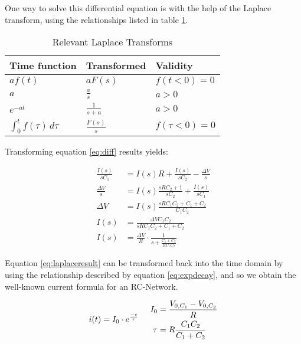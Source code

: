 One way to solve this  differential  equation  is with the help of the Laplace
transform,     using     the      relationships      listed      in      table
\ref{tab:laplace-transforms}.

\begin{table}
    \centering
    \caption{Relevant Laplace Transforms}
    \begin{threeparttable}\begin{tabular}{lll}
        \toprule
        \textbf{Time function}              & \textbf{Transformed} & \textbf{Validity} \\
        \midrule
        $af(t)$                   & $aF(s)$              & $f(t<0)=0$ \\
        $a$                       & $\frac{a}{s}$        & $a > 0$ \\
        $e^{-at}$                 & $\frac{1}{s+a}$      & $a > 0$  \\
        $\int_0^t f(\tau)\,d\tau$ & $\frac{F(s)}{s}$     & $f(\tau<0)=0$ \\
        \bottomrule
    \end{tabular}\end{threeparttable}
    \label{tab:laplace-transforms}
\end{table}

Transforming equation \ref{eq:diff} results yields:

\begin{align}
    \frac{I(s)}{sC_1} &= I(s)R + \frac{I(s)}{sC_2} - \frac{\Delta V}{s}\\
    \frac{\Delta V}{s} &= I(s)\frac{sRC_2 + 1}{sC_2} + \frac{I(s)}{sC_1} \\
    \Delta V &= I(s)\frac{sRC_1C_2 + C_1 + C_2}{C_1C_2} \\
    I(s) &= \frac{\Delta V C_1 C_2}{sRC_1C_2 + C_1 + C_2} \\
    I(s) &= \frac{\Delta V}{R}\cdot\frac{1}{s + \frac{C_1 + C_2}{RC_1C_2}} \label{eq:laplaceresult}
\end{align}

Equation \ref{eq:laplaceresult} can  be  transformed back into the time domain
by using the relationship described by  equation  \ref{eq:expdecay}, and so we
obtain the well-known current formula for an RC-Network.

\begin{equation}
    i(t) = I_0 \cdot e^{\frac{-t}{\tau}} \hspace{5mm} \begin{aligned}
        I_0  &= \frac{V_{0,C_1}-V_{0,C_2}}{R} \\
        \tau &= R \frac{C_1C_2}{C_1+C_2}
    \end{aligned}
    \label{eq:currentresult}
\end{equation}


